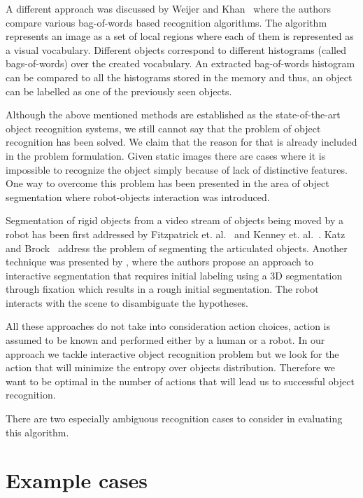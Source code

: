 \documentclass[11pt]{article}
\begin{document}
	A different approach was discussed by Weijer and Khan~\cite{van2013fusing} where the authors compare various bag-of-words based recognition algorithms. The algorithm represents an image as a set of local regions where each of them is represented as a visual vocabulary. Different objects correspond to different histograms (called bags-of-words) over the created vocabulary. An extracted bag-of-words histogram can be compared to all the histograms stored in the memory and thus, an object can be labelled as one of the previously seen objects. 

	Although the above mentioned methods are established as the state-of-the-art object recognition systems, we still cannot say that the problem of object recognition has been solved. We claim that the reason for that is already included in the problem formulation. Given static images there are cases where it is impossible to recognize the object simply because of lack of distinctive features. One way to overcome this problem has been presented in the area of object segmentation where robot-objects interaction was introduced.

	Segmentation of rigid objects from a video stream 
	of objects being moved by a robot has been first addressed by Fitzpatrick et. al.~\cite{fitzpatrick_active_vision} and Kenney et. al.~\cite{KenneyInteractive}.
	Katz and Brock~\cite{Katz-WS-MM-ICRA2011} address
	the problem of segmenting the articulated objects. Another technique was presented by \cite{bergstrom11icvs}, where the authors propose  an   approach  to
	interactive  segmentation that  requires initial  labeling using  a 3D
	segmentation  through  fixation  which  results  in  a  rough  initial
	segmentation. The robot interacts with the scene to disambiguate
	the hypotheses.

	All these approaches do not take into consideration action choices, action is assumed to be known and performed either by a human or a robot. In our approach we tackle interactive object recognition problem but we look for the action that will minimize the entropy over objects distribution. Therefore we want to be optimal in the number of actions that will lead us to successful object recognition.





	There are two especially ambiguous recognition cases to consider in evaluating this algorithm. 
\section{Example cases}
\end{document}
